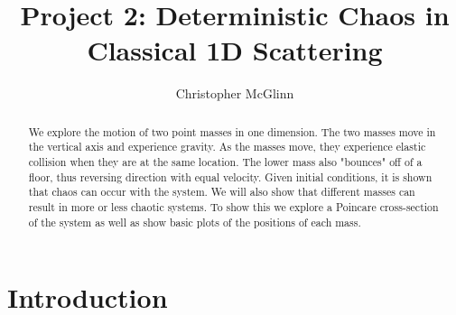 \documentclass[pra,twocolumn,showpacs,amsmath,amssymb]{revtex4-2}
\begin{document}
\title{Project 2: Deterministic Chaos in Classical 1D Scattering}


\author{Christopher McGlinn}

\begin{abstract}
We explore the motion of two point masses in one dimension. The two masses move in the vertical axis and experience gravity. As the masses move, they experience elastic collision when they are at the same location. The lower mass also "bounces" off of a floor, thus reversing direction with equal velocity. Given initial conditions, it is shown that chaos can occur with the system. We will also show that different masses can result in more or less chaotic systems. To show this we explore a Poincare cross-section of the system as well as show basic plots of the positions of each mass.
\end{abstract}



\maketitle

\section{Introduction} \label{sec:intro}
\end{document}
